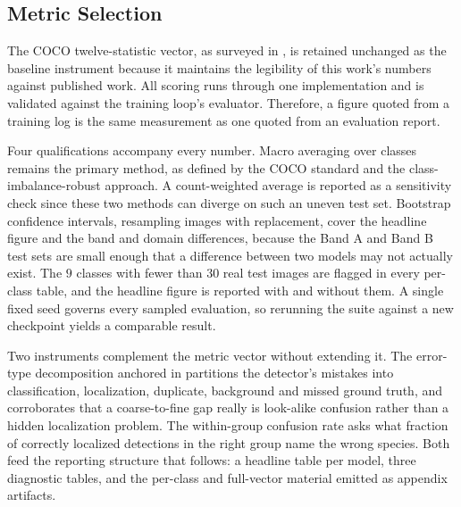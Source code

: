 \subsection{Metric Selection}\label{sec:metric_selection}

The COCO twelve-statistic vector, as surveyed in , is retained unchanged as the baseline instrument because it maintains the legibility of this work's numbers against published work. All scoring runs through one implementation and is validated against the training loop's evaluator. Therefore, a figure quoted from a training log is the same measurement as one quoted from an evaluation report.

Four qualifications accompany every number. Macro averaging over classes remains the primary method, as defined by the COCO standard and the class-imbalance-robust approach. A count-weighted average is reported as a sensitivity check since these two methods can diverge on such an uneven test set. Bootstrap confidence intervals, resampling images with replacement, cover the headline figure and the band and domain differences, because the Band A and Band B test sets are small enough that a difference between two models may not actually exist. The $9$ classes with fewer than $30$ real test images are flagged in every per-class table, and the headline figure is reported with and without them.  %
A single fixed seed governs every sampled evaluation, so rerunning the suite against a new checkpoint yields a comparable result.

Two instruments complement the metric vector without extending it. The error-type decomposition anchored in  partitions the detector's mistakes into classification, localization, duplicate, background and missed ground truth, and corroborates that a coarse-to-fine gap really is look-alike confusion rather than a hidden localization problem. The within-group confusion rate asks what fraction of correctly localized detections in the right group name the wrong species. Both feed the reporting structure that  follows: a headline table per model, three diagnostic tables, and the per-class and full-vector material emitted as appendix artifacts.
